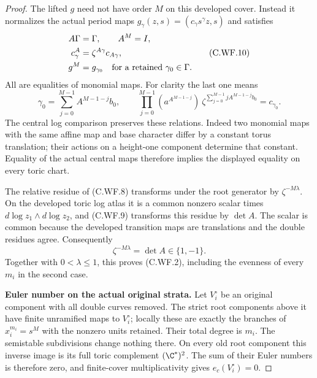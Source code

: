 \begin{proof}
The lifted \(g\) need not have order \(M\) on this developed
cover.  Instead it normalizes the actual period maps
\(g_\gamma(z,s)=(c_\gamma s^\gamma z,s)\) and satisfies
\[
 \begin{split}
 A\Gamma&=\Gamma,\qquad A^M=I,\\
 c_\gamma^A&=\zeta^{A\gamma}c_{A\gamma},\\
 g^M&=g_{\gamma_0}\quad\hbox{for a retained }\gamma_0\in\Gamma .
 \end{split}
\tag{C.WF.10}
\]
All are equalities of monomial maps.  For clarity the last
one means
\[
 \gamma_0=\sum_{j=0}^{M-1}A^{M-1-j}b_0,\qquad
 \prod_{j=0}^{M-1}(a^{A^{M-1-j}})
       \ \zeta^{\sum_{j=0}^{M-1}jA^{M-1-j}b_0}
       =c_{\gamma_0}.
\tag{C.WF.11}
\]
The central log comparison preserves these relations.
Indeed two monomial maps with the same affine map and base
character differ by a constant torus translation; their
actions on a height-one component determine that constant.
Equality of the actual central maps therefore implies the
displayed equality on every toric chart.

The relative residue of (C.WF.8) transforms under the root
generator by \(\zeta^{-M\lambda}\).  On the developed toric
log atlas it is a common nonzero scalar times
\(d\log z_1\wedge d\log z_2\), and (C.WF.9) transforms this
residue by \(\det A\).  The scalar is common because the
developed transition maps are translations and the double
residues agree.  Consequently
\[
                  \zeta^{-M\lambda}=\det A\in\{1,-1\}.
\tag{C.WF.12}
\]
Together with \(0<\lambda\le1\), this proves (C.WF.2),
including the evenness of every \(m_i\) in the second case.

\par\medskip\noindent\textbf{Euler number on the actual original strata.}
Let \(V_i^\circ\) be an original component with all double
curves removed.  The strict root components above it have
finite unramified maps to \(V_i^\circ\); locally these are
exactly the branches of \(x_i^{m_i}=s^M\) with the
nonzero units retained.  Their total degree is \(m_i\).
The semistable subdivisions change nothing there.
On every old root component this inverse image is its full
toric complement \((\C^*)^2\).  The sum of their Euler
numbers is therefore zero, and finite-cover multiplicativity
gives \(e_c(V_i^\circ)=0\).


\end{proof}
